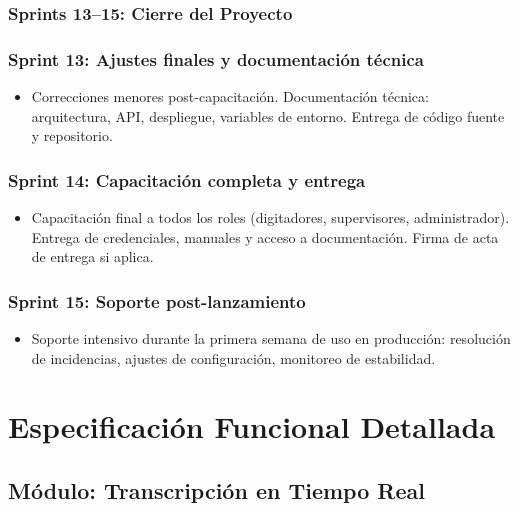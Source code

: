 \documentclass[12pt,a4paper]{report}
\begin{document}
\subsection{Sprints 13--15: Cierre del Proyecto}

\subsection*{Sprint 13: Ajustes finales y documentación técnica}

\begin{itemize}
    \item Correcciones menores post-capacitación. Documentación técnica: arquitectura, API, despliegue, variables de entorno. Entrega de código fuente y repositorio.
\end{itemize}

\subsection*{Sprint 14: Capacitación completa y entrega}

\begin{itemize}
    \item Capacitación final a todos los roles (digitadores, supervisores, administrador). Entrega de credenciales, manuales y acceso a documentación. Firma de acta de entrega si aplica.
\end{itemize}

\subsection*{Sprint 15: Soporte post-lanzamiento}

\begin{itemize}
    \item Soporte intensivo durante la primera semana de uso en producción: resolución de incidencias, ajustes de configuración, monitoreo de estabilidad.
\end{itemize}

\chapter{Especificación Funcional Detallada}

\section{Módulo: Transcripción en Tiempo Real}
\end{document}
